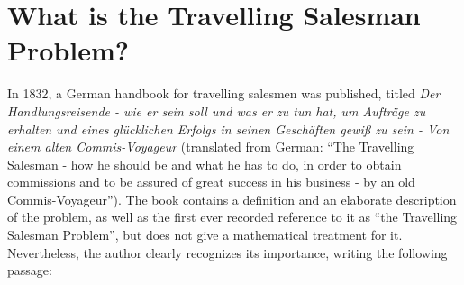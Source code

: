 \newpage
\section{What is the Travelling Salesman Problem?}
\label{IntroTSP}

\par
In 1832, a German handbook for travelling salesmen was published, titled \textit{Der Handlungsreisende - wie er sein soll und was er zu tun hat, um Auftr{\"a}ge zu erhalten und eines gl{\"u}cklichen Erfolgs in seinen Gesch{\"a}ften gewi{\ss} zu sein - Von einem alten Commis-Voyageur} (translated from German: ``The Travelling Salesman - how he should be and what he has to do, in order to obtain commissions and to be assured of great success in his business - by an old Commis-Voyageur'')\cite{tspbook}.
The book contains a definition and an elaborate description of the problem, as well as the first ever recorded reference to it as ``the Travelling Salesman Problem'', but does not give a mathematical treatment for it. Nevertheless, the author clearly recognizes its importance, writing the following passage: 

